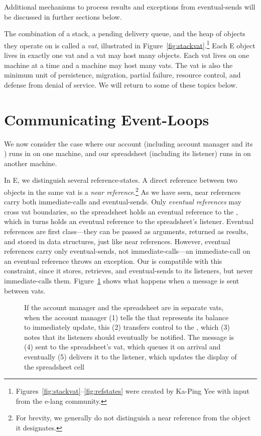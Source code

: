 \documentclass{llncs}
\begin{document}
Additional mechanisms to process results and exceptions from
eventual-sends will be discussed in further sections below.

The combination of a stack, a pending delivery queue, and the heap of
objects they operate on is called a \emph{vat}, illustrated in
Figure~\ref{fig:stackvat}.\footnote{
%
Figures~\ref{fig:stackvat}--\ref{fig:refstates} were created by
Ka-Ping Yee with input from the e-lang community.}
%
Each E object lives in exactly one vat and a vat may host many
objects.  Each vat lives on one machine at a time and a machine may
host many vats. The vat is also the minimum unit of persistence,
migration, partial failure, resource control, and defense from denial
of service. We will return to some of these topics below.

\section{Communicating Event-Loops}

We now consider the case where our account (including account manager
and its ) runs in  on one machine, and our
spreadsheet (including its listener) runs in  on another
machine.

In E, we distinguish several reference-states. A direct reference
between two objects in the same vat is a \emph{near
reference}.\footnote{
%
For brevity, we generally do not distinguish a near reference from the
object it designates.}
%
As we have seen, near references carry both immediate-calls and
eventual-sends. Only \emph{eventual references} may cross vat
boundaries, so the spreadsheet holds an eventual reference to the
, which in turns holds an eventual reference to the
spreadsheet's listener. Eventual references are first class---they can
be passed as arguments, returned as results, and stored in data
structures, just like near references. However, eventual references
carry only eventual-sends, not immediate-calls---an immediate-call on
an eventual reference throws an exception. Our  is
compatible with this constraint, since it stores, retrieves, and
eventual-sends to its listeners, but never immediate-calls them.
Figure~\ref{fig:2vat} shows what happens when a message is sent
between vats.

\begin{figure}
\centerline{}
\caption{If the account manager and the spreadsheet are in separate
  vats, when the account manager (1) tells the 
  that represents its balance to immediately update, this (2)
  transfers control to the , which (3) notes that
  its listeners should eventually be notified. The message is (4) sent
  to the spreadsheet's vat, which queues it on arrival and eventually
  (5) delivers it to the listener, which updates the display of the
  spreadsheet cell}
\label{fig:2vat}
\end{figure}
\end{document}
